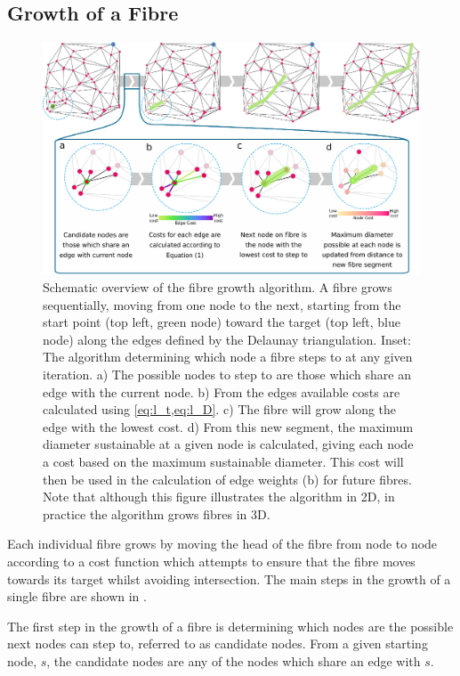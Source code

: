 \subsection{Growth of a Fibre}
\label{sec:growth_of_a_fibre}
\begin{figure}
	\centering
	\includegraphics[width = \textwidth]{figures/config/newMethod_v1.eps}
	\caption{\small Schematic overview of the fibre growth algorithm. A fibre grows sequentially, moving from one node to the next, starting from the start point (top left, green node) toward the target (top left, blue node) along the edges defined by the Delaunay triangulation. Inset: The algorithm determining which node a fibre steps to at any given iteration. a) The possible nodes to step to are those which share an edge with the current node. b) From the edges available costs are calculated using \cref{eq:l_t,eq:l_D}. c) The fibre will grow along the edge with the lowest cost. d) From this new segment, the maximum diameter sustainable at a given node is calculated, giving each node a cost based on the maximum sustainable diameter. This cost will then be used in the calculation of edge weights (b) for future fibres. Note that although this figure illustrates the algorithm in 2D, in practice the algorithm grows fibres in 3D.} 
	\label{fig:config_method}
\end{figure}
Each individual  fibre grows by moving the head of the fibre from node to node according to a cost function which attempts to ensure that the fibre moves towards its target whilst avoiding intersection.
The main steps in the growth of a single fibre are shown in . 

The first step in the growth of a fibre is determining which nodes are the possible next nodes can step to, referred to as candidate nodes.
From a given starting node, $s$, the candidate nodes are any of the nodes which share an edge with $s$.

